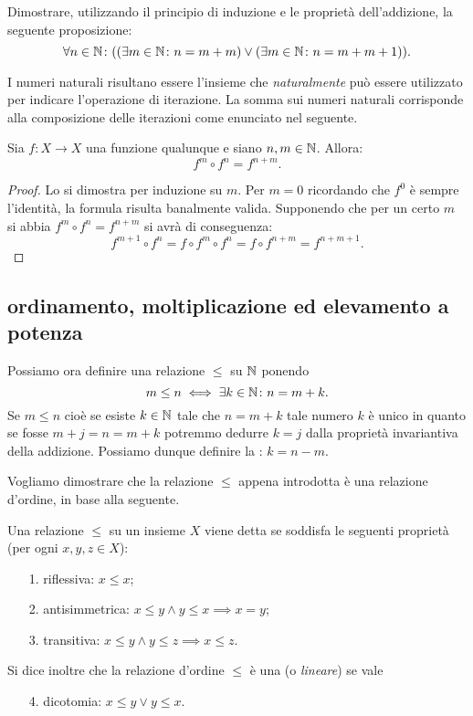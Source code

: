 \begin{exercise}
  Dimostrare, utilizzando il principio di induzione e le proprietà 
  dell'addizione, la seguente 
  proposizione:
  \[
  \forall n\in {\mathbb N}\colon {\left( {\left( \exists m\in {\mathbb N}\colon n = m + m \right)} 
  \lor {\left( \exists m\in {\mathbb N}\colon n = m + m + 1 \right)} \right)}.  
  \]
\end{exercise}

I numeri naturali risultano essere l'insieme che \emph{naturalmente} può 
essere utilizzato per indicare l'operazione di iterazione. 
La somma sui numeri 
naturali corrisponde alla composizione delle iterazioni come 
enunciato nel seguente.

\begin{theorem}
  \label{th:iterata_composta}%
  Sia $f\colon X\to X$ una funzione qualunque e siano $n,m\in {\mathbb N}$. 
  Allora:
\[
  f^m \circ f^n = f^{n+m}. 
\]
\end{theorem}
%
\begin{proof}
  Lo si dimostra per induzione su $m$.
  Per $m=0$ ricordando che $f^0$ è sempre l'identità, la formula risulta banalmente valida.
  Supponendo che per un certo $m$ si abbia $f^m \circ f^n = f^{n+m}$
  si avrà di conseguenza: 
  \[
    f^{m+1}\circ f^n = f\circ f^m \circ f^n = f\circ f^{n+m}
     = f^{n+m+1}. 
  \] 
\end{proof}

\subsection{ordinamento, moltiplicazione ed elevamento a potenza}
Possiamo ora definire una relazione $\le$ su ${\mathbb N}$ ponendo 
\[
  m \le n \iff \exists k\in {\mathbb N}\colon n = m+k.  
\]
Se $m\le n$ cioè se esiste $k\in {\mathbb N}$ tale che $n=m+k$ tale numero 
$k$ è unico in quanto se fosse $m+j=n=m+k$ potremmo dedurre $k=j$
dalla proprietà invariantiva della addizione. 
Possiamo dunque definire la : $k=n-m$.

Vogliamo dimostrare che la relazione $\le$ appena introdotta 
è una relazione d'ordine, in base alla seguente.

\begin{definition}
  \label{def:ordine}%
  Una relazione
  $\le$ su un insieme $X$ viene detta
  se soddisfa le seguenti proprietà (per ogni $x,y,z\in X$):
  \begin{enumerate}
    \item[1.] riflessiva: $x\le x$;
    \item[2.] antisimmetrica: $x\le y \land y\le x \implies x=y$;
    \item[3.] transitiva: $x\le y \land y\le z \implies x\le z$.
  \end{enumerate}
  Si dice inoltre che la relazione d'ordine $\le$
  è una  (o \emph{lineare}) 
  se vale
  \begin{enumerate}
    \item[4.] dicotomia: $x\le y \lor y\le x$.
  \end{enumerate}
\end{definition}

